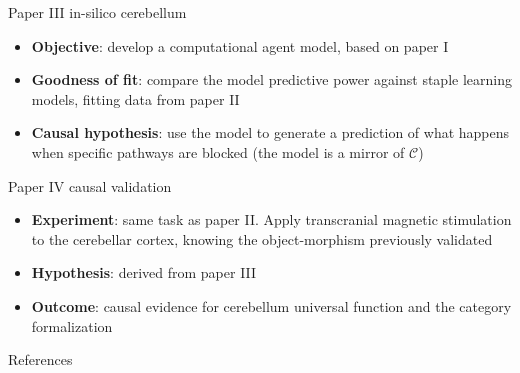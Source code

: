 \documentclass[aspectratio=169]{beamer}
\begin{document}
	\begin{frame}{Paper III in-silico cerebellum}
		\begin{itemize}
			\item \textbf{Objective}: develop a computational agent model, based on paper I
			\item \textbf{Goodness of fit}: compare the model predictive power against staple learning models, fitting data from paper II
			\item \textbf{Causal hypothesis}: use the model to generate a prediction of what happens when specific pathways are blocked (the model is a mirror of $\mathcal{C}$)
		\end{itemize}
	\end{frame}
	
	\begin{frame}{Paper IV causal validation}
		\begin{itemize}
			\item \textbf{Experiment}: same task as paper II. Apply transcranial magnetic stimulation to the cerebellar cortex, knowing the object-morphism previously validated
			\item \textbf{Hypothesis}: derived from paper III
			\item \textbf{Outcome}: causal evidence for cerebellum universal function and the category formalization
		\end{itemize}
	\end{frame}
	
	\begin{frame}{References}
		\printbibliography
	\end{frame}
	
\end{document}
